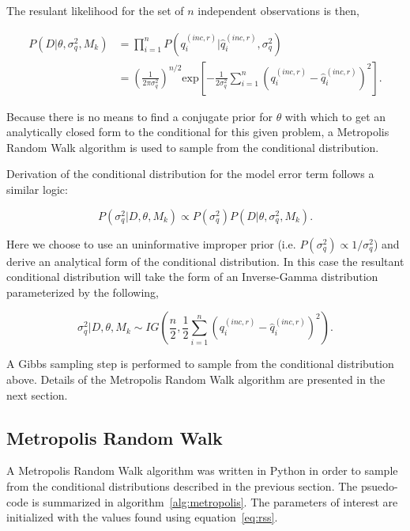 \documentclass[article]{proc}
\begin{document}
        \noindent The resulant likelihood for the set of $n$ independent observations is then,

        \begin{align}\label{eq:likelihood_2}
            P(D| \theta, \sigma_q^2, M_k) &= \prod_{i=1}^n P(q_i^{(inc,r)}| \hat{q}_i^{(inc,r)}, \sigma_q^2) \\
            &= \left(\frac{1}{2 \pi \sigma_q^2} \right)^{n/2} \text{exp} \left[-\frac{1}{2 \sigma_q^2} \sum_{i=1}^n \left(q_i^{(inc,r)} - \hat{q}_i^{(inc,r)} \right)^2 \right].
        \end{align}

        \noindent Because there is no means to find a conjugate prior for $\theta$ with which to get an analytically closed form to the conditional for this given problem, a Metropolis Random Walk algorithm is used to sample from the conditional distribution.

        Derivation of the conditional distribution for the model error term follows a similar logic:

        \begin{equation}\label{eq:sigma_q}
            P(\sigma_q^2 | D, \theta, M_k) \propto P(\sigma_q^2) P(D| \theta, \sigma_q^2, M_k).
        \end{equation}

        \noindent Here we choose to use an uninformative improper prior (i.e. $P(\sigma_q^2) \propto 1/\sigma_q^2$) and derive an analytical form of the conditional distribution. In this case the resultant conditional distribution will take the form of an Inverse-Gamma distribution parameterized by the following,

        \begin{equation}\label{eq:sigma_q_conditional}
            \sigma_q^2 | D, \theta, M_k \sim IG \left(\frac{n}{2},  \frac{1}{2}\sum_{i=1}^n \left(q_i^{(inc,r)} - \hat{q}_i^{(inc,r)} \right)^2\right).
        \end{equation}

        \noindent A Gibbs sampling step is performed to sample from the conditional distribution above. Details of the Metropolis Random Walk algorithm are presented in the next section.

    \subsection{Metropolis Random Walk}

        A Metropolis Random Walk algorithm was written in Python in order to sample from the conditional distributions described in the previous section. The psuedo-code is summarized in algorithm~\ref{alg:metropolis}. The parameters of interest are initialized with the values found using equation~\ref{eq:rss}.   
\end{document}

